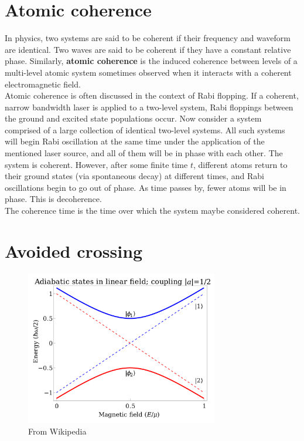 \documentclass{book}
\theoremstyle{definition}
\begin{document}
\section*{Atomic coherence}

In physics, two systems are said to be coherent if their frequency and waveform are identical. Two waves are said to be coherent if they have a constant relative phase. Similarly, \textbf{atomic coherence} is the induced coherence between levels of a multi-level atomic system sometimes observed when it interacts with a coherent electromagnetic field.\\


Atomic coherence is often discussed in the context of Rabi flopping. If a coherent, narrow bandwidth laser is applied to a two-level system, Rabi floppings between the ground and excited state populations occur. Now consider a system comprised of a large collection of identical two-level systems. All such systems will begin Rabi oscillation at the same time under the application of the mentioned laser source, and all of them will be in phase with each other. The system is coherent. However, after some finite time $t$, different atoms return to their ground states (via spontaneous decay) at different times, and Rabi oscillations begin to go out of phase. As time passes by, fewer atoms will be in phase. This is decoherence. \\

The coherence time is the time over which the system maybe considered coherent. 

\section*{Avoided crossing}


\begin{figure}[!htb]
	\centering
	\includegraphics*[width=0.75\textwidth]{images/avoided_crossing}
	\caption{From Wikipedia}
\end{figure}
\end{document}
